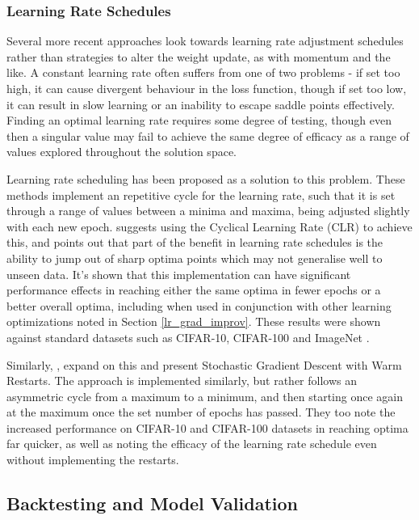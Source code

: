 \documentclass[a4paper,11pt,oneside]{article}
\theoremstyle{plain}
\theoremstyle{definition}
\begin{document}
	
	
	\subsubsection{Learning Rate Schedules}
	
	Several more recent approaches look towards learning rate adjustment schedules rather than strategies to alter the 
	weight update, as with momentum and the like. A constant learning rate often suffers from one of two problems - 
	if set too high, it can cause divergent behaviour in the loss function, though if set too low, it can result in slow 
	learning or an inability to escape saddle points effectively. Finding an optimal learning rate requires some degree
	of testing, though even then a singular value may fail to achieve the same degree of efficacy as a range of values 
	explored throughout the solution space. \newline
	
	Learning rate scheduling has been proposed as a solution to this problem. These methods implement an repetitive cycle 
	for the learning rate, such that it is set through a range of values between a minima and maxima, being adjusted slightly 
	with each new epoch. \citet{Smith} suggests using the Cyclical Learning Rate (CLR) to achieve this, and points out that part of the benefit 
	in learning rate schedules is the ability to jump out of sharp optima points which may not generalise well to unseen data. 
	It's shown that this implementation can have significant performance effects in reaching either the same optima in fewer epochs or a better 
	overall optima, including when used in conjunction with other learning optimizations noted in Section \ref{lr_grad_improv}. These results were 
	shown against standard datasets such as CIFAR-10, CIFAR-100 and ImageNet \citep{Smith}. \newline
	
	Similarly, \citet{Loshchilov}, expand on this and present Stochastic Gradient Descent with Warm Restarts. The approach is 
	implemented similarly, but rather follows an asymmetric cycle from a maximum to a minimum, and then starting once again at the maximum once the set number 
	of epochs has passed. They too note the increased performance on CIFAR-10 and CIFAR-100 datasets in reaching optima far quicker, as well as noting the efficacy of the 
	learning rate schedule even without implementing the restarts.
	
	
	
	\subsection{Backtesting and Model Validation} \label{lr_backtesting}
	\hfill
	
\end{document}
